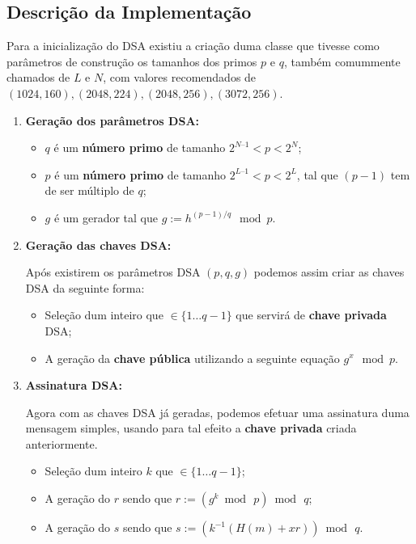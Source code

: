 \documentclass[12pt]{report}
\providecommand{\tightlist}{%
      \setlength{\itemsep}{0pt}\setlength{\parskip}{0pt}}
\begin{document}
\subsection{Descrição da
Implementação}\label{descriuxe7uxe3o-da-implementauxe7uxe3o}
\vspace{2 mm}
Para a inicialização do DSA existiu a criação duma classe que tivesse
como parâmetros de construção os tamanhos dos primos \(p\) e \(q\),
também comummente chamados de \(L\) e \(N\), com valores recomendados de
\((1024, 160), (2048, 224), (2048, 256), (3072, 256)\).
\vspace{2 mm}
\begin{enumerate}
\def\labelenumi{\arabic{enumi}.}
\item
  \textbf{Geração dos parâmetros DSA:}

  \begin{itemize}
  \tightlist
  \item
    \(q\) é um \textbf{número primo} de tamanho \(2^{N–1} < p < 2^{N}\);\vspace{2 mm}
  \item
    \(p\) é um \textbf{número primo} de tamanho \(2^{L–1} < p < 2^{L}\),
    tal que \((p-1)\) tem de ser múltiplo de \(q\);\vspace{2 mm}
  \item
    \(g\) é um gerador tal que \(g := h^{(p - 1)/q} \mod p\).
  \end{itemize}
\vspace{2 mm}
\item
  \textbf{Geração das chaves DSA:}

  Após existirem os parâmetros DSA \((p, q, g)\) podemos assim
  criar as chaves DSA da seguinte forma:

  \begin{itemize}
  \tightlist
  \item
    Seleção dum inteiro que \(\in \{ 1 \ldots q-1 \}\) que servirá de
    \textbf{chave privada} DSA;\vspace{2 mm}
  \item
    A geração da \textbf{chave pública} utilizando a seguinte equação
    \(g^x \mod p\).
  \end{itemize}
\item
  \textbf{Assinatura DSA:}

  Agora com as chaves DSA já geradas, podemos efetuar uma
  assinatura duma mensagem simples, usando para tal efeito a \textbf{chave
  privada} criada anteriormente.

  \begin{itemize}
  \tightlist
  \item
    Seleção dum inteiro \(k\) que \(\in \{ 1 \ldots q-1 \}\);
\vspace{2 mm}
  \item
    A geração do \(r\) sendo que \(r := (g^{k}\bmod\,p)\bmod\,q\);
\vspace{2 mm}
  \item
    A geração do \(s\) sendo que \(s := (k^{-1}(H(m)+xr))\bmod\,q\).
  \end{itemize}


\end{enumerate}
\end{document}
